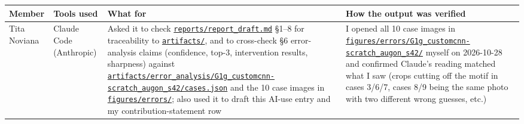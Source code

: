 \documentclass[10pt,a4paper]{article}
\newcounter{none} %
\begin{document}
{\def\LTcaptype{none} %
\begin{longtable}[]{@{}
  >{\raggedright\arraybackslash}p{}
  >{\raggedright\arraybackslash}p{}
  >{\raggedright\arraybackslash}p{}
  >{\raggedright\arraybackslash}p{}@{}}
\toprule\noalign{}
\begin{minipage}[b]{\linewidth}\raggedright
Member
\end{minipage} & \begin{minipage}[b]{\linewidth}\raggedright
Tools used
\end{minipage} & \begin{minipage}[b]{\linewidth}\raggedright
What for
\end{minipage} & \begin{minipage}[b]{\linewidth}\raggedright
How the output was verified
\end{minipage} \\
\midrule\noalign{}
\endhead
\bottomrule\noalign{}
\endlastfoot
Tita Noviana & Claude Code (Anthropic) & Asked it to check \href{https://github.com/Universitas-Cakrawala/semarang-batik-fine-grained-transfer-learning/blob/main/reports/report_draft.md}{\texttt{reports/\allowbreak{}report\_\allowbreak{}draft.md}} §1--8 for traceability to \href{https://github.com/Universitas-Cakrawala/semarang-batik-fine-grained-transfer-learning/tree/main/artifacts}{\texttt{artifacts/\allowbreak{}}}, and to cross-check §6 error-analysis claims (confidence, top-3, intervention results, sharpness) against \href{https://github.com/Universitas-Cakrawala/semarang-batik-fine-grained-transfer-learning/blob/main/artifacts/error_analysis/G1g_customcnn-scratch_augon_s42/cases.json}{\texttt{artifacts/\allowbreak{}error\_\allowbreak{}analysis/\allowbreak{}G1g\_\allowbreak{}customcnn-\allowbreak{}scratch\_\allowbreak{}augon\_\allowbreak{}s42/\allowbreak{}cases.json}} and the 10 case images in \href{https://github.com/Universitas-Cakrawala/semarang-batik-fine-grained-transfer-learning/tree/main/figures/errors}{\texttt{figures/\allowbreak{}errors/\allowbreak{}}}; also used it to draft this AI-use entry and my contribution-statement row & I opened all 10 case images in \href{https://github.com/Universitas-Cakrawala/semarang-batik-fine-grained-transfer-learning/tree/main/figures/errors/G1g_customcnn-scratch_augon_s42}{\texttt{figures/\allowbreak{}errors/\allowbreak{}G1g\_\allowbreak{}customcnn-\allowbreak{}scratch\_\allowbreak{}augon\_\allowbreak{}s42/\allowbreak{}}} myself on 2026-10-28 and confirmed Claude's reading matched what I saw (crops cutting off the motif in cases 3/6/7, cases 8/9 being the same photo with two different wrong guesses, etc.) \\

\end{longtable}}
\end{document}
